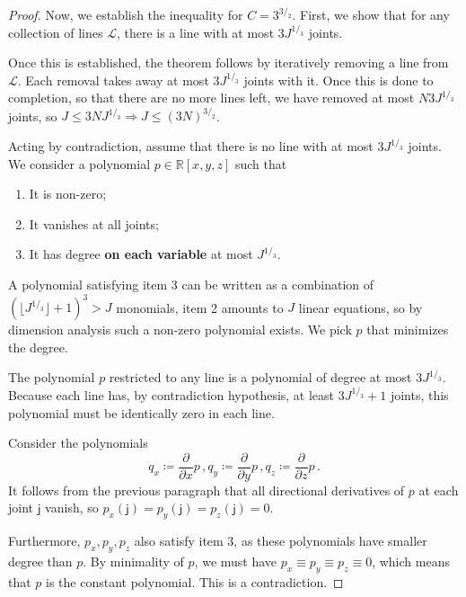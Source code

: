 \documentclass[12pt]{amsart}
\theoremstyle{definition}
\newtheorem{smpl}[thm]{Example}
\newtheorem{conj}[thm]{Conjecture}
\newcommand{\R}{\mathbb{R}}
\newcommand{\vj}{\mathsf{j}}
\begin{document}
\begin{proof}
Now, we establish the inequality for $C = 3^{3/_2}$.
First, we show that for any collection of lines $\mathcal L$, there is a line with at most $3 J^{1/_3}$ joints.

Once this is established, the theorem follows by iteratively removing a line from $\mathcal L$.
Each removal takes away at most $3 J^{1/_3}$ joints with it.
Once this is done to completion, so that there are no more lines left, we have removed at most $N 3 J^{1/_3}$ joints, so $J \leq 3 N J^{1/_3} \Rightarrow J \leq (3N)^{3/_2}$.


Acting by contradiction, assume that there is no line with at most $3 J^{1/_3}$ joints. 
We consider a polynomial $p \in \R[x, y, z]$ such that 
\begin{enumerate}
\item It is non-zero;

\item It vanishes at all joints;

\item It has degree \textbf{on each variable} at most $J^{1/_3}$.
\end{enumerate}

A polynomial satisfying item 3 can be written as a combination of $(\lfloor J^{1/_3}\rfloor + 1)^3 > J$ monomials, item 2 amounts to $J$ linear equations, so by dimension analysis such a non-zero polynomial exists.
We pick $p$ that minimizes the degree.

The polynomial $p$ restricted to any line is a polynomial of degree at most $3J^{1/_3}$.
Because each line has, by contradiction hypothesis, at least $3 J^{1/_3} + 1$ joints, this polynomial must be identically zero in each line.

Consider the polynomials
$$q_x \coloneqq \frac{\partial}{\partial x} p \, , q_y \coloneqq \frac{\partial}{\partial y} p \, , q_z \coloneqq \frac{\partial}{\partial z} p \, .$$
It follows from the previous paragraph that all directional derivatives of $p$ at each joint $\vj$ vanish, so $p_x(\vj) = p_y(\vj) = p_z(\vj) = 0$.

Furthermore, $p_x, p_y, p_z$ also satisfy item 3, as these polynomials have smaller degree than $p$.
By minimality of $p$, we must have $p_x \equiv p_y \equiv p_z  \equiv 0$, which means that $p$ is the constant polynomial.
This is a contradiction.
\end{proof}
%
%
%
%
%
%
\end{document}
